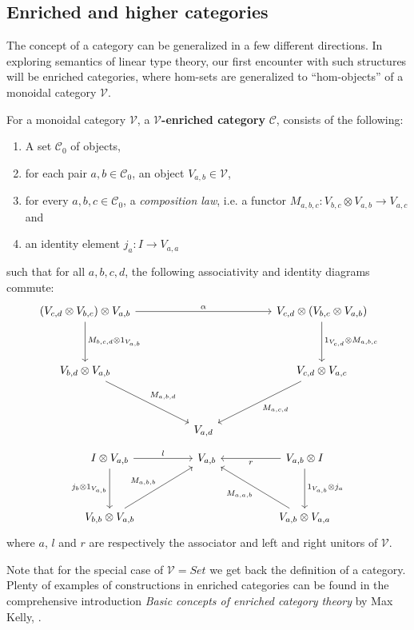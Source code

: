 \subsection{Enriched and higher categories}
The concept of a category can be generalized in a few different directions. In exploring semantics of linear type theory, our first encounter with such structures will be  enriched categories, where hom-sets are generalized to ``hom-objects'' of a monoidal category $\mathcal{V}$.
\begin{defn}\label{enr-cat}
  For a monoidal category $\mathcal{V}$, a \textbf{$\mathcal{V}$-enriched category} $\mathcal{C}$, consists of the following:
  \begin{enumerate}
  \item A set $\mathcal{C}_0$ of objects,
  \item for each pair $a, b \in \mathcal{C}_0$, an object $V_{a,b} \in \mathcal{V}$,
  \item for every $a, b, c \in \mathcal{C}_0$, a \textit{composition law}, i.e. a functor $M_{a, b, c} : V_{b, c} \otimes V_{a, b} \to V_{a, c}$ and
  \item an identity element $j_a : I \to V_{a, a}$
\end{enumerate}
such that for all $a, b, c, d$, the following associativity and identity diagrams commute:
    \[
      \ti
      (V_{c, d} \otimes V_{b, c}) \otimes V_{a, b} \ar[d, "{M_{b, c, d} \otimes 1_{V_{a,b}}}"] \ar[rr, "\alpha"] & & V_{c, d} \otimes (V_{b, c} \otimes V_{a, b}) \ar[d, "{1_{V_{c,d}} \otimes M_{a, b, c}}"]\\
      V_{b, d} \otimes V_{a, b} \ar[rd, "M_{a, b, d}"] & & V_{c, d} \otimes V_{a, c} \ar[ld, "M_{a, c, d}"]\\
      & V_{a, d}      &
      \kz
    \]
    \[
      \ti
      I \otimes V_{a, b} \ar[d, "j_b \otimes 1_{V_{a, b}}", swap] \ar[r, "l"] & V_{a, b} & V_{a, b} \otimes I \ar[l, "r"] \ar[d, "1_{V_{a, b}} \otimes j_a"] \\
      V_{b, b} \otimes V_{a, b} \ar[ru, "M_{a, b, b}"] & & V_{a, b} \otimes V_{a, a} \ar[lu, "M_{a, a, b}"]
      \kz
    \]
    where $a$, $l$ and $r$ are respectively the associator and left and right unitors of $\mathcal{V}$.
\end{defn}
Note that for the special case of $\mathcal{V} = Set$ we get back the definition of a category. Plenty of examples of constructions in enriched categories can be found in the comprehensive introduction \textit{Basic concepts of enriched category theory} by Max Kelly, \cite{kelly}.\\
